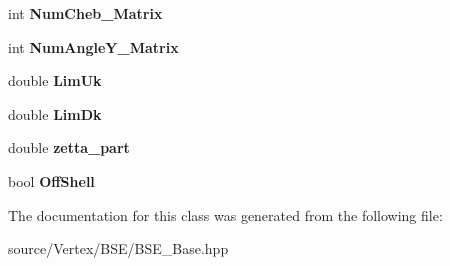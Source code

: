 \begin{DoxyCompactItemize}
\item 
\hypertarget{class_c___b_s_e___hadron__parameters_afa402937e179655de9ccec21b82a217a}{int {\bfseries Num\-Cheb\-\_\-\-Matrix}}\label{class_c___b_s_e___hadron__parameters_afa402937e179655de9ccec21b82a217a}

\item 
\hypertarget{class_c___b_s_e___hadron__parameters_acdac430bcba98a4ebd36125dca8e2b84}{int {\bfseries Num\-Angle\-Y\-\_\-\-Matrix}}\label{class_c___b_s_e___hadron__parameters_acdac430bcba98a4ebd36125dca8e2b84}

\item 
\hypertarget{class_c___b_s_e___hadron__parameters_a613d1099920c29bca627385d25b530df}{double {\bfseries Lim\-Uk}}\label{class_c___b_s_e___hadron__parameters_a613d1099920c29bca627385d25b530df}

\item 
\hypertarget{class_c___b_s_e___hadron__parameters_aa2e276f9dbf35b46dc7627cf3b354460}{double {\bfseries Lim\-Dk}}\label{class_c___b_s_e___hadron__parameters_aa2e276f9dbf35b46dc7627cf3b354460}

\item 
\hypertarget{class_c___b_s_e___hadron__parameters_afeb651bcc9c2086093f62adb20f15882}{double {\bfseries zetta\-\_\-part}}\label{class_c___b_s_e___hadron__parameters_afeb651bcc9c2086093f62adb20f15882}

\item 
\hypertarget{class_c___b_s_e___hadron__parameters_a56755348cb398bda3fda906396452c0b}{bool {\bfseries Off\-Shell}}\label{class_c___b_s_e___hadron__parameters_a56755348cb398bda3fda906396452c0b}

\end{DoxyCompactItemize}


The documentation for this class was generated from the following file\-:\begin{DoxyCompactItemize}
\item 
source/\-Vertex/\-B\-S\-E/B\-S\-E\-\_\-\-Base.\-hpp\end{DoxyCompactItemize}
